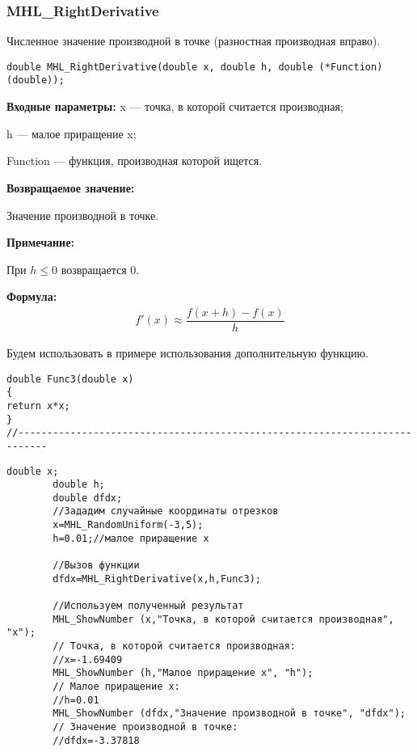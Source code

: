 \documentclass[a4paper,12pt]{article}
\begin{document}
\subsubsection{MHL\_RightDerivative}\label{MHL_RightDerivative}

Численное значение производной в точке (разностная производная вправо).


\begin{lstlisting}[label=code_syntax_MHL_RightDerivative,caption=Синтаксис]
double MHL_RightDerivative(double x, double h, double (*Function)(double));
\end{lstlisting}

\textbf{Входные параметры:}
 x --- точка, в которой считается производная;
 
 h --- малое приращение x;
 
 Function --- функция, производная которой ищется.

\textbf{Возвращаемое значение:}
 
 Значение производной в точке.
 
 \textbf{Примечание:}
 
 При $h\leq0$ возвращается $0$.

\textbf{Формула:}
\begin{eqnarray*}
f'\left( x\right) \approx \dfrac{f\left( x+h\right)-f\left( x\right) }{h}
\end{eqnarray*}

Будем использовать в примере использования дополнительную функцию.

\begin{lstlisting}[caption=Дополнительная функция]
double Func3(double x)
{
return x*x;
}
//---------------------------------------------------------------------------
\end{lstlisting}


\begin{lstlisting}[label=code_use_MHL_RightDerivative,caption=Пример использования]
        double x;
        double h;
        double dfdx;
        //Зададим случайные координаты отрезков
        x=MHL_RandomUniform(-3,5);
        h=0.01;//малое приращение x

        //Вызов функции
        dfdx=MHL_RightDerivative(x,h,Func3);

        //Используем полученный результат
        MHL_ShowNumber (x,"Точка, в которой считается производная", "x");
        // Точка, в которой считается производная:
        //x=-1.69409
        MHL_ShowNumber (h,"Малое приращение x", "h");
        // Малое приращение x:
        //h=0.01
        MHL_ShowNumber (dfdx,"Значение производной в точке", "dfdx");
        // Значение производной в точке:
        //dfdx=-3.37818
\end{lstlisting}
\end{document}

